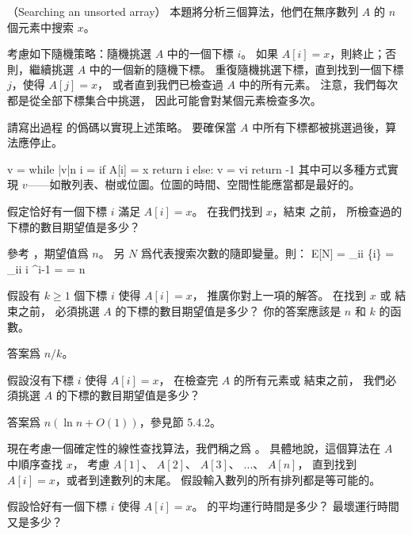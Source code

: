 \stopPROBLEM

\startPROBLEM（Searching an unsorted array）
本題將分析三個算法，他們在無序數列 $A$ 的 $n$ 個元素中搜索 $x$。

考慮如下隨機策略：隨機挑選 $A$ 中的一個下標 $i$。
如果 $A[i] = x$，則終止；否則，繼續挑選 $A$ 中的一個新的隨機下標。
重復隨機挑選下標，直到找到一個下標 $j$，使得 $A[j] = x$，
或者直到我們已檢查過 $A$ 中的所有元素。
注意，我們每次都是從全部下標集合中挑選，
因此可能會對某個元素檢查多次。
\startigBase[a]
\item 請寫出過程  的僞碼以實現上述策略。
要確保當 $A$ 中所有下標都被挑選過後，算法應停止。
\stopigBase

\startANSWER
{}
\startCLRSCODE
v = \emptyset
while |v|\ne n
	i = 
	if A[i] = x
		return i
	else:
		v = v\cup i
return -1
\stopCLRSCODE
其中可以多種方式實現 $v$——如散列表、樹或位圖。位圖的時間、空間性能應當都是最好的。
\stopANSWER

\startigBase[continue]
\item 假定恰好有一個下標 $i$ 滿足 $A[i] = x$。
在我們找到 $x$，結束  之前，
所檢查過的下標的數目期望值是多少？
\stopigBase

\startANSWER
參考 ，期望值爲 $n$。
另 $N$ 爲代表搜索次數的隨即變量。則：
\startsplitformula\startmathalignment
\NC E[N] \NC = \sum_{i}i \Pr\{i\} \NR\allowbreak
\NC \NC = \sum_{i\ge i} i ^{i-1}  \NR
\NC \NC =   \NR
\NC \NC = n \NR
\stopmathalignment\stopsplitformula
\stopANSWER

\startigBase[continue]
\item 假設有 $k\ge 1$ 個下標 $i$ 使得 $A[i] = x$，
推廣你對上一項的解答。
在找到 $x$ 或  結束之前，
必須挑選 $A$ 的下標的數目期望值是多少？
你的答案應該是 $n$ 和 $k$ 的函數。
\stopigBase

\startANSWER
答案爲 $n/k$。
\stopANSWER

\startigBase[continue]
\item 假設沒有下標 $i$ 使得 $A[i] = x$，
在檢查完 $A$ 的所有元素或  結束之前，
我們必須挑選 $A$ 的下標的數目期望值是多少？
\stopigBase

\startANSWER
答案爲 $n(\ln{n} + O(1))$，參見節 5.4.2。
\stopANSWER

現在考慮一個確定性的線性查找算法，我們稱之爲 。
具體地說，這個算法在 $A$ 中順序查找 $x$，
考慮 $A[1]$、 $A[2]$、 $A[3]$、 $\ldots$、 $A[n]$，
直到找到 $A[i] = x$，或者到達數列的末尾。
假設輸入數列的所有排列都是等可能的。
\startigBase[continue]
\item 假設恰好有一個下標 $i$ 使得 $A[i] = x$。
 的平均運行時間是多少？
最壞運行時間又是多少？
\stopigBase

